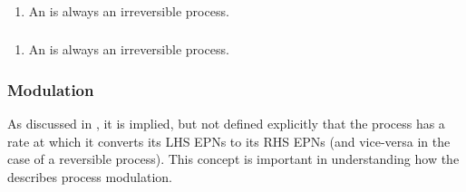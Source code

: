 \subsubsection{}

  \begin{enumerate}
    \item An  is always an irreversible process.
\end{enumerate}  

\subsubsection{}
  \begin{enumerate}
    \item An  is always an irreversible process.
\end{enumerate}  

\subsubsection{Modulation}
\label{sec:mod-semantics}

As discussed in , it is implied, but not defined explicitly that the process has a rate at
which it converts its LHS EPNs to its RHS EPNs (and vice-versa in the case of a reversible process). This concept is
important in understanding how the \PDl describes process modulation.

